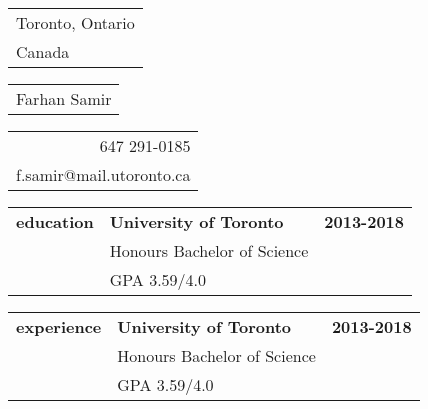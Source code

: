 \documentclass{article}
\begin{document}
\begin{table}[t]
  \begin{tabular}[t]{l}
  Toronto, Ontario \\
  Canada
  \end{tabular}\hfill
  \begin{tabular}[t]{c}
    Farhan Samir
  \end{tabular}\hfill
  \begin{tabular}[t]{r}
  647 291-0185\\
  f.samir@mail.utoronto.ca
  \end{tabular}
\end{table}

\begin{tabular}{L{4cm} L{5cm} R{\dimexpr\textwidth-9cm-36pt}}
  \textbf{education} & \textbf{University of Toronto}\hfill & \textbf{2013-2018} \\
   & Honours Bachelor of Science & \\
   & GPA 3.59/4.0 & \\
\end{tabular}
\newline
\vspace*{1cm}

\begin{tabular}{L{4cm} L{5cm} R{\dimexpr\textwidth-9cm-36pt}}
  \textbf{experience} & \textbf{University of Toronto}\hfill & \textbf{2013-2018} \\
   & Honours Bachelor of Science & \\
   & GPA 3.59/4.0 & \\
\end{tabular}
\end{document}
